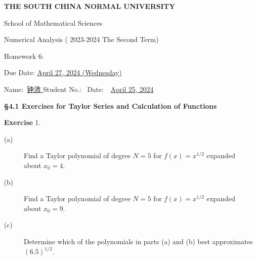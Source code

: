\documentclass[UTF8,12pt,hyperref]{ctexart}
\makeatletter
\newenvironment{exercise}[1][{\color{blue}\bf Exercise}]%
{%
 \begin{center}   \begin{lrbox}{\@tempboxa}%
    \begin{minipage}{\textwidth}%
  {\color{blue}\bfseries
#1}   }{%
    \end{minipage}%
    \end{lrbox}
    \colorbox{green}{\noindent\usebox{\@tempboxa}} \end{center}  
}
\makeatother
\begin{document}

\begin{center}
{\bf  THE SOUTH CHINA NORMAL UNIVERSITY\vspace{0.08cm}

School of Mathematical Sciences\vspace{0.08cm}
 
Numerical Analysis ( 2023-2024 The Second Term) \vspace{0.18cm}

{\Large Homework 6: }\vspace{0.18cm}

Due Date: \underline{April  27, 2024 (Wednesday)} }
\end{center}\vspace{-0.16cm}

\begin{center}
  Name:\ \underline{\qquad 钟沛 \hspace{1cm}}\hspace{0.298cm}  
  Student No.:\ \underline{\hspace{1cm}} 
%
Date:\ \ \underline{April 25, 2024} 
 \end{center}
 
 

\begin{center}  \bf \Large
{\S  4.1 Exercises for Taylor Series and Calculation of Functions}
\end{center} 

\begin{exercise}1. \quad
\begin{description}
\item[(a)] Find a Taylor polynomial of degree $N = 5$ for $f(x) = x^{1/2}$ expanded about $x_0 =4$.
\item[(b)] Find a Taylor polynomial of degree $N = 5$ for $f(x) = x^{1/2}$ expanded about $x_0 =9$.
\item[(c)] Determine which of the polynomials in parts (a) and (b) best approximates $(6.5)^{1/2}$. 
\end{description} 
\end{exercise}
\end{document}
